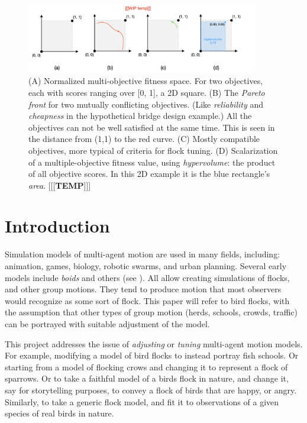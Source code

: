\documentclass[letterpaper]{article}
\begin{document}

\begin{figure}[t]
    \centering
    \includegraphics[width=0.9\textwidth]{images/temp_MOF_HV.png}
    \caption{(A) Normalized multi-objective fitness space. For two objectives, each with scores ranging over [0, 1], a 2D square. (B) The \textit{Pareto front} for two mutually conflicting objectives. (Like \textit{reliability} and \textit{cheapness} in the hypothetical bridge design example.) All the objectives can not be well satisfied at the same time. This is seen in the distance from (1,1) to the red curve. (C) Mostly compatible objectives, more typical of criteria for flock tuning. (D) Scalarization of a multiple-objective fitness value, using \textit{hypervolume}: the product of all objective scores. In this 2D example it is the blue rectangle's \textit{area}. [[[\textbf{TEMP}]]]}
    \label{fig:MOF_HV}
\end{figure}

\section{Introduction}
\label{sec:intro}

Simulation models of multi-agent motion are used in many fields, including: animation, games, biology, robotic swarms, and urban planning. Several early models include \textit{boids} \citep{reynolds_flocks_1987} and others (see ). All allow creating simulations of flocks, and other group motions.  They tend to produce motion that most observers would recognize as some sort of flock. This paper will refer to bird flocks, with the assumption that other types of group motion (herds, schools, crowds, traffic) can be portrayed with suitable adjustment of the model.

This project addresses the issue of \textit{adjusting} or \textit{tuning} multi-agent motion models. For example, modifying a model of bird flocks to instead portray fish schools. Or starting from a model of flocking crows and changing it to represent a flock of sparrows. Or to take a faithful model of a birds flock in nature, and change it, say for storytelling purposes, to convey a flock of birds that are happy, or angry. Similarly, to take a generic flock model, and fit it to observations of a given species of real birds in nature.
\end{document}
